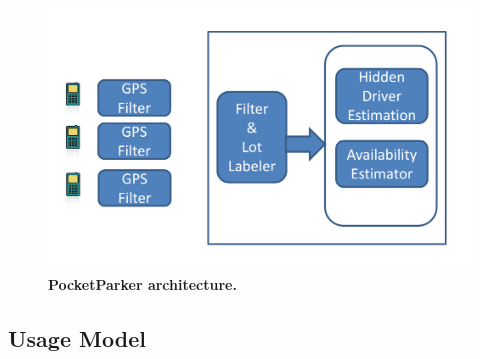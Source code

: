 \begin{figure}
\centering
\includegraphics[width=\columnwidth]{./figures/blockdiagram.pdf}

\caption{\textbf{PocketParker architecture.}}

\label{fig-arch}
\end{figure}

\subsection{Usage Model}
